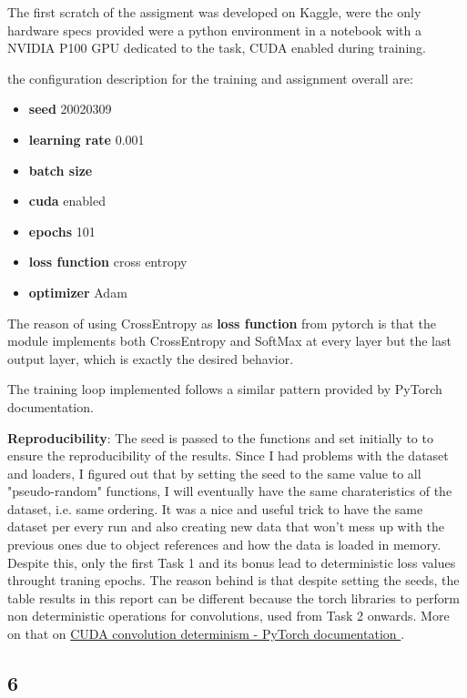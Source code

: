 \documentclass[11pt]{scrartcl}
\begin{document}
The first scratch of the assigment was developed on Kaggle, were the only hardware specs 
provided were a python environment in a notebook with a NVIDIA P100 GPU dedicated to the task,
CUDA enabled during training.

the configuration description for the training and assignment overall are:

\begin{itemize}
	\item \textbf{seed} 20020309 
	\item \textbf{learning rate} 0.001
	\item \textbf{batch size}
	\item \textbf{cuda} enabled
	\item \textbf{epochs} 101
	\item \textbf{loss function} cross entropy 
	\item \textbf{optimizer} Adam
\end{itemize}

The reason of using CrossEntropy as \textbf{loss function} from pytorch is that the 
module implements both CrossEntropy and SoftMax at every layer but the last output layer,
which is exactly the desired behavior.

The training loop implemented follows a similar pattern provided by PyTorch documentation.

\textbf{Reproducibility}:
The seed is passed to the functions 
and set initially to 
to ensure the reproducibility of the results.
Since I had problems with the dataset and loaders, 
I figured out that by setting the seed to the same value
to all "pseudo-random" functions,
I will eventually have the same charateristics of the dataset, 
i.e. same ordering.
It was a nice and useful trick to have the same dataset per every run
and also creating new data that won't mess up with the previous ones due to 
object references and how the data is loaded in memory.
Despite this, only the first Task 1 and its bonus lead to 
deterministic loss values throught traning epochs.
The reason behind is that despite setting the seeds, 
the table results in this report can be different because
the torch libraries to perform non deterministic operations
for convolutions, used from Task 2 onwards.
More on that on \href{https://pytorch.org/docs/stable/notes/randomness.html}{
	CUDA convolution determinism - PyTorch documentation
}.

\subsection*{6}
\end{document}

